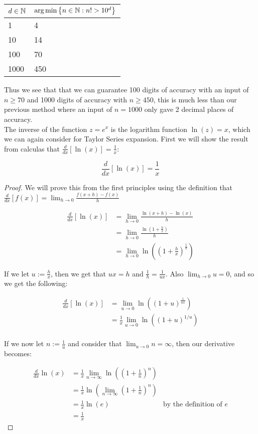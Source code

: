 \begin{center}
\begin{tabular}{|l|l|}
\hline
\(d \in \mathbb{N}\) 
	& \(\textrm{arg}\min\left\{n \in \mathbb{N} : n! > 10^d\right\}\)\\\hline
1 & 4\\\hline
10 & 14 \\\hline
100 & 70 \\\hline
1000 & 450\\\hline
\end{tabular}
\end{center}

Thus we see that that we can guarantee 100 digits of accuracy with an input of \(n \ge 70\) and 1000 digits of accuracy with \(n \ge 450\), this is much less than our previous method where an input of \(n = 1000\) only gave 2 decimal places of accuracy.\\

The inverse of the function \(z = e^x\) is the logarithm function \(\ln(z) = x\), which we can again consider for Taylor Series expansion. First we will show the result from calculas that \(\frac{d}{dx}[\ln(x)] = \frac{1}{x}\):

\begin{nat log dif}
\[\frac{d}{dx}[\ln(x)] = \frac{1}{x}\]
\end{nat log dif}
\begin{proof}
We will prove this from the first principles using the definition that \(\frac{d}{dx}[f(x)] = \lim_{h\to 0} \frac{f(x + h) - f(x)}{h}\)

\begin{align*}
	\frac{d}{dx}[\ln(x)] 
		&= \lim_{h\to 0}\frac{\ln(x + h) - \ln(x)}{h}\\
		&= \lim_{h\to 0}\frac{\ln(1 + \frac{h}{x})}{h}\\
		&= \lim_{h\to 0}\ln\left((1+\frac{h}{x})^{\frac{1}{h}}\right)
\end{align*}

If we let \(u := \frac{h}{x}\), then we get that \(ux = h\) and \(\frac{1}{h} = \frac{1}{ux}\). Also \(\lim_{h\to 0}u = 0\), and so we get the following:

\begin{align*}
	\frac{d}{dx}[\ln(x)]
		&= \lim_{u\to 0}\ln((1+u)^{\frac{1}{ux}})\\
		&= \frac{1}{x}\lim_{u\to 0}\ln((1+u)^{1/u})\\
\end{align*}

If we now let \(n := \frac{1}{u}\) and consider that \(\lim_{u\to 0} n = \infty\), then our derivative becomes:

\begin{align*}
	\frac{d}{dx}\ln(x) 
		&= \frac{1}{x}\lim_{n\to\infty}\ln((1 + \frac{1}{n})^n)\\
		&= \frac{1}{x}\ln(\lim_{n\to\infty}(1+\frac{1}{n})^n)\\
		&= \frac{1}{x}\ln(e) &\textrm{by the definition of \(e\)}\\
		&= \frac{1}{x}
\end{align*}
\end{proof}

